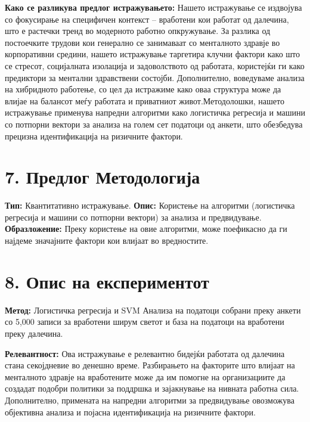 \documentclass[12pt]{article}
\begin{document}
\textbf{Како се разликува предлог истражувањето:} \newline
 Нашето истражување се издвојува со фокусирање на специфичен контекст – вработени кои работат од далечина, што е растечки тренд во модерното работно опкружување. За разлика од постоечките трудови кои генерално се занимаваат со менталното здравје во корпоративни средини, нашето истражување таргетира клучни фактори како што се стресот, социјалната изолација и задоволството од работата, користејќи ги како предиктори за ментални здравствени состојби. Дополнително, воведуваме анализа на хибридното работење, со цел да истражиме како оваа структура може да влијае на балансот меѓу работата и приватниот живот.Методолошки, нашето истражување применува напредни алгоритми како логистичка регресија и машини со потпорни вектори за анализа на голем сет податоци од анкети, што обезбедува прецизна идентификација на ризичните фактори.
 

\section*{7. Предлог Методологија}
\textbf{Тип:} Квантитативно истражување. \newline
\textbf{Опис:} Користење на алгоритми (логистичка регресија и машини со потпорни вектори) за анализа и предвидување. \newline 
\textbf{Образложение:} Преку користење на овие алгоритми, може поефикасно да ги најдеме значајните фактори кои влијаат во вредностите. \newline 

\section*{8. Опис на експериментот}
\textbf{Метод:}  
Логистичка регресија и SVM Анализа на податоци собрани преку анкети со 5,000 записи за вработени ширум светот и база на податоци на вработени преку далечина.  

\textbf{Релевантност:}  
Ова истражување е релевантно бидејќи работата од далечина стана секојдневие во денешно време. Разбирањето на факторите што влијаат на менталното здравје на вработените може да им помогне на организациите да создадат подобри политики за поддршка и зајакнување на нивната работна сила. Дополнително, примената на напредни алгоритми за предвидување овозможува објективна анализа и појасна идентификација на ризичните фактори.
\end{document}
